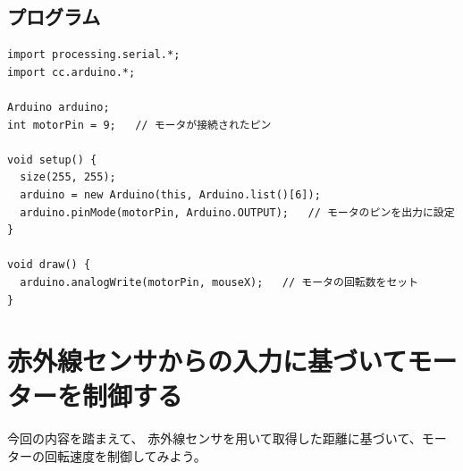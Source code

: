 \documentclass[11pt,a4paper]{jarticle}
\begin{document}
\subsection*{プログラム}
\begin{lstlisting}
import processing.serial.*;
import cc.arduino.*;
 
Arduino arduino;
int motorPin = 9;   // モータが接続されたピン
 
void setup() {
  size(255, 255);
  arduino = new Arduino(this, Arduino.list()[6]);
  arduino.pinMode(motorPin, Arduino.OUTPUT);   // モータのピンを出力に設定
}
 
void draw() {
  arduino.analogWrite(motorPin, mouseX);   // モータの回転数をセット
}
\end{lstlisting}


\section{赤外線センサからの入力に基づいてモーターを制御する}
今回の内容を踏まえて、
赤外線センサを用いて取得した距離に基づいて、モーターの回転速度を制御してみよう。
\end{document}
